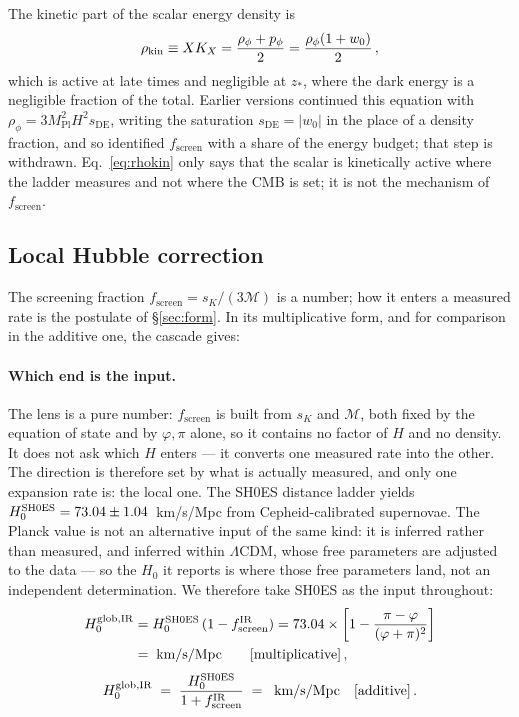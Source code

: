\documentclass[12pt,a4paper]{article}
\newcommand{\phiG}{\varphi}
\newcommand{\MIRA}{\mathcal{M}}
\newcommand{\Mpl}{M_{\mathrm{Pl}}}
\newcommand{\fsc}{f_{\mathrm{screen}}}
\newcommand{\sK}{s_K}          %
\newcommand{\sDE}{s_{\mathrm{DE}}} %
\begin{document}
The kinetic part of the scalar energy density is
\begin{equation}
  \rho_{\rm kin} \equiv X K_X = \frac{\rho_\phi+p_\phi}{2}
  = \frac{\rho_\phi(1+w_0)}{2}\,,
  \label{eq:rhokin}
\end{equation}
which is active at late times and negligible at $z_*$, where the dark energy
is a negligible fraction of the total. Earlier versions continued this equation
with $\rho_\phi = 3\Mpl^2H^2\sDE$, writing the saturation $\sDE=|w_0|$ in the
place of a density fraction, and so identified $\fsc$ with a share of the
energy budget; that step is withdrawn. Eq.~\eqref{eq:rhokin} only says that the
scalar is kinetically active where the ladder measures and not where the CMB
is set; it is not the mechanism of $\fsc$.

\subsection{Local Hubble correction}
\label{sec:localH0}

The screening fraction $\fsc = \sK/(3\MIRA)$ is a number; how it enters a
measured rate is the postulate of §\ref{sec:form}. In its multiplicative form,
and for comparison in the additive one, the cascade gives:

\paragraph{Which end is the input.}
The lens is a pure number: $\fsc$ is built from $\sK$ and $\MIRA$, both fixed
by the equation of state and by $\phiG,\pi$ alone, so it contains no factor of
$H$ and no density. It does not ask which $H$ enters --- it converts one
measured rate into the other. The direction is therefore set by what is
actually measured, and only one expansion rate is: the local one. The SH0ES
distance ladder \citep{Riess2022} yields $H_0^{\rm SH0ES}=73.04\pm1.04$~km/s/Mpc
from Cepheid-calibrated supernovae. The Planck value is not an alternative
input of the same kind: it is inferred rather than measured, and inferred
within $\Lambda$CDM, whose free parameters are adjusted to the data --- so the
$H_0$ it reports is where those free parameters land, not an independent
determination. We therefore take SH0ES as the input throughout:
\begin{equation}
  \begin{aligned}
  H_0^{\rm glob,IR} &= H_0^{\rm SH0ES}\,(1-\fsc^{\rm IR})
  = 73.04\times\left[1 - \frac{\pi-\phiG}{(\phiG+\pi)^2}\right]\\
  &= \val{p9_sh0es_glob_IR}\;\text{km/s/Mpc}\qquad[\text{multiplicative}]\,,
  \end{aligned}
  \label{eq:H0local}
\end{equation}
\begin{equation}
  H_0^{\rm glob,IR} \;=\; \frac{H_0^{\rm SH0ES}}{1+\fsc^{\rm IR}}
  \;=\; \val{p9_add_H}\;\text{km/s/Mpc}
  \quad[\text{additive}]\,.
  \label{eq:H0local_add}
\end{equation}
\end{document}
